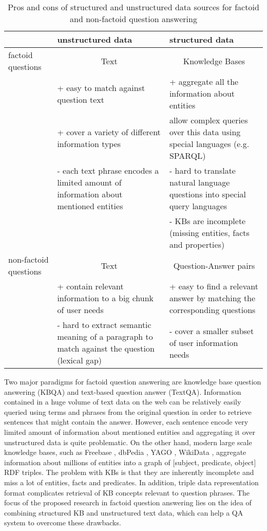\begin{table}
\centering
\caption{Pros and cons of structured and unstructured data sources for factoid and non-factoid question answering}
\begin{tabular}{| l | p{6cm} | p{6cm} |}
\hline
 & unstructured data & structured data \\
\hline
factoid questions & \multicolumn{1}{|c|}{Text} & \multicolumn{1}{|c|}{Knowledge Bases} \\
 & + easy to match against question text & + aggregate all the information about entities\\
 & + cover a variety of different information types & allow complex queries over this data using special languages (e.g. SPARQL) \\
 & - each text phrase encodes a limited amount of information about mentioned entities & - hard to translate natural language questions into special query languages \\
&  & - KBs are incomplete (missing entities, facts and properties) \\
\hline
non-factoid questions & \multicolumn{1}{|c|}{Text} & \multicolumn{1}{|c|}{Question-Answer pairs} \\
 & + contain relevant information to a big chunk of user needs & + easy to find a relevant answer by matching the corresponding questions \\
 & - hard to extract semantic meaning of a paragraph to match against the question (lexical gap) & - cover a smaller subset of user information needs \\
\hline
\end{tabular}
\label{table:data_procons}
\end{table}

Two major paradigms for factoid question answering are knowledge base question answering (KBQA) and text-based question answer (TextQA).
Information contained in a huge volume of text data on the web can be relatively easily queried using terms and phrases from the original question in order to retrieve sentences that might contain the answer.
However, each sentence encode very limited amount of information about mentioned entities and aggregating it over unstructured data is quite problematic.
On the other hand, modern large scale knowledge bases, such as Freebase \cite{Bollacker:2008:FCC:1376616.1376746}, dbPedia \cite{auer2007dbpedia}, YAGO \cite{yago3}, WikiData \cite{vrandevcic2014wikidata}, aggregate information about millions of entities into a graph of [subject, predicate, object] RDF triples.
The problem with KBs is that they are inherently incomplete and miss a lot of entities, facts and predicates.
In addition, triple data representation format complicates retrieval of KB concepts relevant to question phrases.
The focus of the proposed research in factoid question answering lies on the idea of combining structured KB and unstructured text data, which can help a QA system to overcome these drawbacks.


